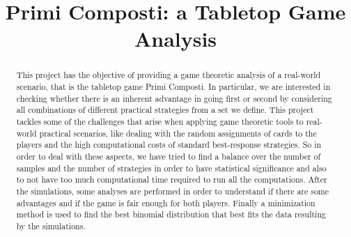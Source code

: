 \documentclass[conference]{IEEEtran}
\begin{document}
\title{Primi Composti: a Tabletop Game Analysis}

\author{
\and
{}
\and
{}
}
\maketitle

\begin{abstract}
	This project has the objective of providing a game theoretic analysis of a real-world scenario, that is the tabletop game Primi Composti. In particular, we are interested in checking whether there is an inherent advantage in going first or second by considering all combinations of different practical strategies from a set we define.
	This project tackles some of the challenges that arise when applying game theoretic tools to real-world practical scenarios, like dealing with the random assignments of cards to the players and the high computational costs of standard best-response strategies. So in order to deal with these aspects, we have tried to find a balance over the number of samples and the number of strategies in order to have statistical significance and also to not have too much computational time required to run all the computations.
    After the simulations, some analyses are performed in order to understand if there are some advantages and if the game is fair enough for both players.
    Finally a minimization method is used to find the best binomial distribution that best fits the data resulting by the simulations.
\end{abstract}




%

\end{document}
